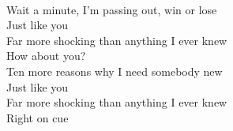 \\
Wait a minute, I'm passing out, win or lose \\
Just like you \\
Far more shocking than anything I ever knew \\
How about you? \\
Ten more reasons why I need somebody new \\
Just like you \\
Far more shocking than anything I ever knew \\
Right on cue

\newpage
